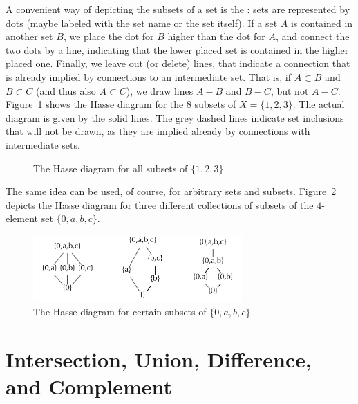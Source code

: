 A convenient way of depicting the subsets of a set is the : sets are represented by dots (maybe labeled with the set name or
the set itself). If a set $A$ is contained in another set $B$, we place the
dot for $B$ higher than the dot for $A$, and connect the two dots by a line,
indicating that the lower placed set is contained in the higher placed one.
Finally, we leave out (or delete) lines, that indicate a connection that is
already implied by connections to an intermediate set. That is, if $A\subset
B$ and $B\subset C$ (and thus also $A\subset C$), we draw lines $A-B$ and
$B-C$, but not $A-C$. Figure~\ref{fighasse3set} shows the Hasse diagram for
the $8$ subsets of $X=\{1,2,3\}$. The actual diagram is given by the solid
lines. The grey dashed lines indicate set inclusions that will not be drawn,
as they are implied already by connections with intermediate sets.

\begin{figure}[t]
\begin{center}
\end{center}
\caption{The Hasse diagram for all subsets of $\{1,2,3\}$.}
\label{fighasse3set}
\end{figure}

The same idea can be used, of course, for arbitrary sets and subsets.
Figure~\ref{fighasseV4} depicts the Hasse diagram for three different
collections of subsets of the $4$-element set $\{0,a,b,c\}$.

\begin{figure}[t]
\begin{center}
\includegraphics[width=8cm]{pic/HasseV4.pdf}
\end{center}
\caption{The Hasse diagram for certain subsets of $\{0,a,b,c\}$.}
\label{fighasseV4}
\end{figure}



\section{Intersection, Union, Difference, and Complement}

